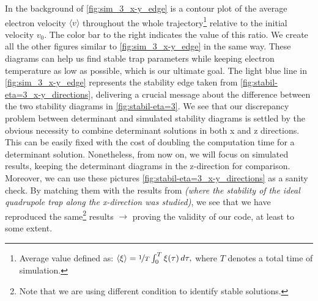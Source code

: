 In the background of \ref{fig:sim_3_x-y_edge} is a contour plot of the average electron velocity $\langle v \rangle$ throughout the whole trajectory\footnote{Average value defined as: $\langle \xi \rangle = \nicefrac{1}{T} \int_{0}^{T} \xi(\tau) \, d\tau,$ where $T$ denotes a total time of simulation.} relative to the initial velocity $v_0$. The color bar to the right indicates the value of this ratio. We create all the other figures similar to \ref{fig:sim_3_x-y_edge} in the same way. These diagrams can help us find stable trap parameters while keeping electron temperature as low as possible, which is our ultimate goal. The light blue line in \ref{fig:sim_3_x-y_edge} represents the stability edge taken from \ref{fig:stabil-eta=3_x-y_directions}, delivering a crucial message about the difference between the two stability diagrams in \ref{fig:stabil-eta=3}. We see that our discrepancy problem between determinant and simulated stability diagrams is settled by the obvious necessity to combine determinant solutions in both x and z directions. This can be easily fixed with the cost of doubling the computation time for a determinant solution. Nonetheless, from now on, we will focus on simulated results, keeping the determinant diagrams in the z-direction for comparison. Moreover, we can use these pictures \ref{fig:stabil-eta=3_x-y_directions} as a sanity check. By matching them with the results from \cite{leefer2017investigation} \textit{(where the stability of the ideal quadrupole trap along the x-direction was studied)}, we see that we have reproduced the same\footnote{Note that we are using different condition to identify stable solutions.} results $\rightarrow$ proving the validity of our code, at least to some extent.
